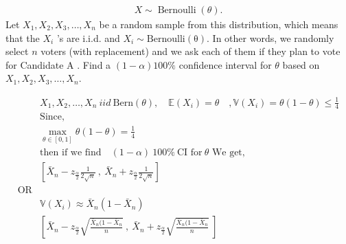\documentclass[12pt,a4paper]{article}
\begin{document}
\begin{align*}
X \sim \operatorname{Bernoulli}(\theta) .
\end{align*}
Let \(X_1, X_2, X_3, \ldots, X_n\) be a random sample from this distribution, which means that the \(X_i\) 's are i.i.d. and \(X_i \sim \operatorname{Bernoulli(\theta )}\). In other words, we randomly select \(n\) voters (with replacement) and we ask each of them if they plan to vote for Candidate A . Find a \((1-\alpha) 100 \%\) confidence interval for \(\theta\) based on \(X_1, X_2, X_3, \ldots, X_n\).

\begin{align*}
    &X_{1},X_{2},\ldots,X_{n} \ iid \ \mathrm{Bern}(\theta) , \quad \mathbb{E}(X_{i})= \theta \quad , \mathbb{V}(X_{i})=\theta(1-\theta) \leq \frac{1}{4} \\
    &\text{Since,}\\
    &\max_{\theta \in [0,1]}\theta(1-\theta) = \frac{1}{4} \\
    &\text{then if we find} \quad (1-\alpha) \ 100\% \ \text{CI for} \ \theta \text{ We get,}\\
    &\left[ \bar{X}_{n} - z_\frac{{\alpha}}{2}\frac{1}{2\sqrt{n}} \ , \ \bar{X}_{n} + z_\frac{{\alpha}}{2}\frac{1}{2\sqrt{n}}  \right]\\
    \text{OR}\\
    &\mathbb{V}(X_{i})\approx \bar{X}_{n}(1-\bar{X}_{n})\\
    &\left[ \bar{X}_{n} - z_\frac{{\alpha}}{2}\sqrt{\frac{\bar{X}_{n}(1-\bar{X}_{n}}{n}} \ , \ \bar{X}_{n} + z_\frac{{\alpha}}{2}\sqrt{\frac{\bar{X}_{n}(1-\bar{X}_{n}}{n}} \ \right]\\
\end{align*}
\end{document}
